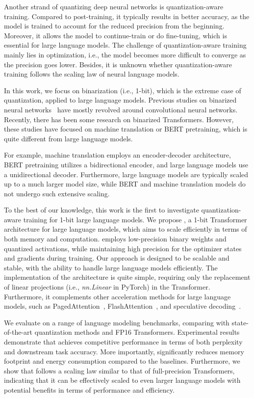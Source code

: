 Another strand of quantizing deep neural networks is quantization-aware training. Compared to post-training, it typically results in better accuracy, as the model is trained to account for the reduced precision from the beginning. Moreover, it allows the model to continue-train or do fine-tuning, which is essential for large language models. The challenge of quantization-aware training mainly lies in optimization, i.e., the model becomes more difficult to converge as the precision goes lower. Besides, it is unknown whether quantization-aware training follows the scaling law of neural language models.

In this work, we focus on binarization (i.e., 1-bit), which is the extreme case of quantization, applied to large language models. Previous studies on binarized neural networks~\cite{xnornet, xnornet++} have mostly revolved around convolutional neural networks. Recently, there has been some research on binarized Transformers. However, these studies have focused on machine translation or BERT pretraining, which is quite different from large language models.

For example, machine translation employs an encoder-decoder architecture, BERT pretraining utilizes a bidirectional encoder, and large language models use a unidirectional decoder. Furthermore, large language models are typically scaled up to a much larger model size, while BERT and machine translation models do not undergo such extensive scaling.

To the best of our knowledge, this work is the first to investigate quantization-aware training for 1-bit large language models. We propose \our{}, a 1-bit Transformer architecture for large language models, which aims to scale efficiently in terms of both memory and computation. \our{} employs low-precision binary weights and quantized activations, while maintaining high precision for the optimizer states and gradients during training. Our approach is designed to be scalable and stable, with the ability to handle large language models efficiently. The implementation of the \our{} architecture is quite simple, requiring only the replacement of linear projections (i.e., \emph{nn.Linear} in PyTorch) in the Transformer. Furthermore, it complements other acceleration methods for large language models, such as PagedAttention~\cite{pageattn}, FlashAttention~\cite{flashattn,flashattn2}, and speculative decoding~\cite{specdecoding}.

We evaluate \our{} on a range of language modeling benchmarks, comparing with state-of-the-art quantization methods and FP16 Transformers. Experimental results demonstrate that \our{} achieves competitive performance in terms of both perplexity and downstream task accuracy. More importantly, \our{} significantly reduces memory footprint and energy consumption compared to the baselines. Furthermore, we show that \our{} follows a scaling law similar to that of full-precision Transformers, indicating that it can be effectively scaled to even larger language models with potential benefits in terms of performance and efficiency.

